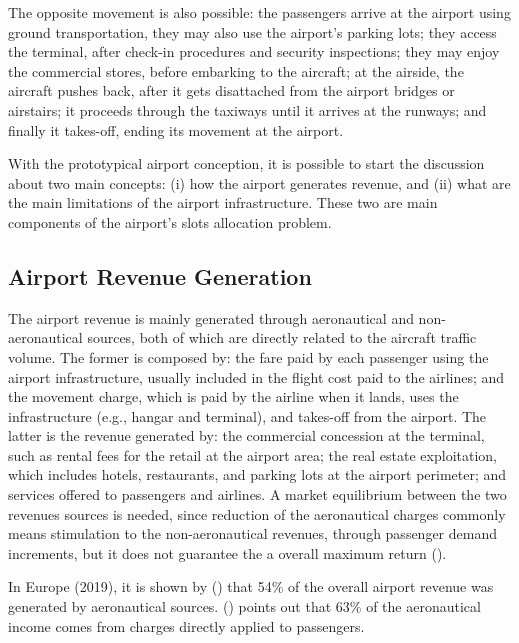 The opposite movement is also possible: the passengers arrive at the airport using ground transportation, they may also use the airport’s parking lots; they access the terminal, after check-in procedures and security inspections; they may enjoy the commercial stores, before embarking to the aircraft; at the airside, the aircraft pushes back, after it gets disattached from the airport bridges or airstairs; it proceeds through the taxiways until it arrives at the runways; and finally it takes-off, ending its movement at the airport. 

With the prototypical airport conception, it is possible to start the discussion about two main concepts: (i) how the airport generates revenue, and (ii) what are the main limitations of the airport infrastructure. These two are main components of the airport’s slots allocation problem.

\subsection{Airport Revenue Generation}

The airport revenue is mainly generated through aeronautical and non-aeronautical sources, both of which are directly related to the aircraft traffic volume. The former is composed by: the fare paid by each passenger using the airport infrastructure, usually included in the flight cost paid to the airlines; and the movement charge, which is paid by the airline when it lands, uses the infrastructure (e.g., hangar and terminal), and takes-off from the airport. The latter is the revenue generated by: the commercial concession at the terminal, such as rental fees for the retail at the airport area; the real estate exploitation, which includes hotels, restaurants, and parking lots at the airport perimeter; and services offered to passengers and airlines. A market equilibrium between the two revenues sources is needed, since reduction of the aeronautical charges commonly means stimulation to the non-aeronautical revenues, through passenger demand increments, but it does not guarantee the a overall maximum return (\citealp{ICAO2013}).

In Europe (2019), it is shown by \citeauthor{ACI2021} (\citeyear{ACI2021}) that 54\% of the overall airport revenue was generated by aeronautical sources. \citeauthor{ICAO2013} (\citeyear{ICAO2013}) points out that 63\% of the  aeronautical income comes from charges directly applied to passengers. 

